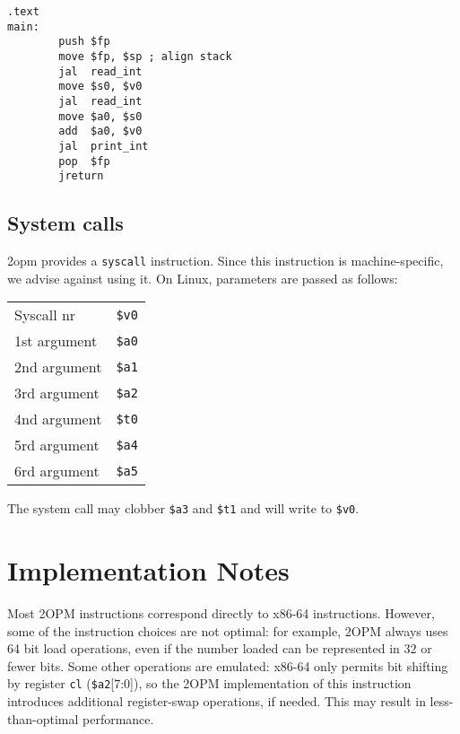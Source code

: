 \documentclass{article}
\begin{document}
\begin{lstlisting}
.text
main:
        push $fp
        move $fp, $sp ; align stack
        jal  read_int
        move $s0, $v0
        jal  read_int
        move $a0, $s0
        add  $a0, $v0
        jal  print_int
        pop  $fp
        jreturn
\end{lstlisting}


\subsection{System calls}
2opm provides a \texttt{syscall} instruction.  Since this
instruction is machine-specific, we advise against using it.
On Linux, parameters are passed as follows:

\begin{tabular}{ll}
  Syscall nr & \texttt{\$v0} \\
  1st argument & \texttt{\$a0} \\
  2nd argument & \texttt{\$a1} \\
  3rd argument & \texttt{\$a2} \\
  4nd argument & \texttt{\$t0} \\
  5rd argument & \texttt{\$a4} \\
  6rd argument & \texttt{\$a5} \\
\end{tabular}

The system call may clobber \texttt{\$a3} and \texttt{\$t1}
and will write to \texttt{\$v0}.

\section{Implementation Notes}

Most 2OPM instructions correspond directly to x86-64 instructions.
However, some of the instruction choices are not optimal: for example,
2OPM always uses 64 bit load operations, even if the number loaded can
be represented in 32 or fewer bits.  Some other operations are
emulated: x86-64 only permits bit shifting by register \texttt{cl}
(\texttt{\$a2}[7:0]), so the 2OPM implementation of this instruction
introduces additional register-swap operations, if needed.  This may
result in less-than-optimal performance.
\end{document}
